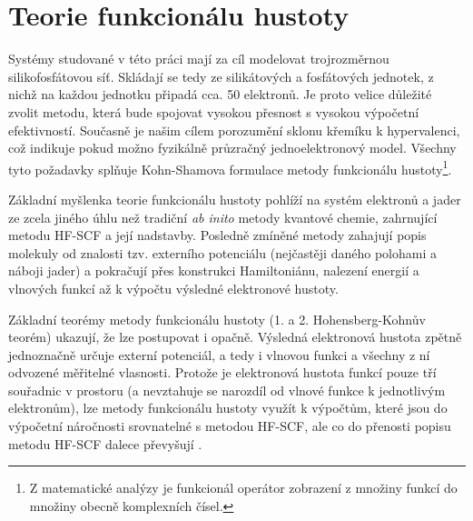 \documentclass[
digital, %
table,   %
lof,     %
lot,     %
oneside,
]{fithesis3}
\begin{document}
\section{Teorie funkcionálu hustoty}
Systémy studované v této práci mají za cíl modelovat trojrozměrnou silikofosfátovou síť. Skládají se tedy ze silikátových a fosfátových jednotek, z nichž na každou jednotku připadá cca. 50 elektronů. Je proto velice důležité zvolit metodu, která bude spojovat vysokou přesnost s vysokou výpočetní efektivností. Současně je našim cílem porozumění sklonu křemíku k hypervalenci, což indikuje pokud možno fyzikálně průzračný jednoelektronový model. Všechny tyto požadavky splňuje Kohn-Shamova formulace metody funkcionálu hustoty\footnote{Z matematické analýzy je funkcionál operátor zobrazení z množiny funkcí do množiny obecně komplexních čísel.}\cite{bickelhaupt2007kohn}.

Základní myšlenka teorie funkcionálu hustoty pohlíží na systém elektronů a jader ze zcela jiného úhlu než tradiční \textit{ab inito} metody kvantové chemie, zahrnující metodu HF-SCF a její nadstavby. Posledně zmíněné metody zahajují popis molekuly od znalosti tzv. externího potenciálu (nejčastěji daného polohami a náboji jader) a pokračují přes konstrukci Hamiltoniánu, nalezení energií a vlnových funkcí až k výpočtu výsledné elektronové hustoty.

Základní teorémy metody funkcionálu hustoty (1. a 2. Hohensberg-Kohnův teorém) ukazují, že lze postupovat i opačně. Výsledná elektronová hustota zpětně jednoznačně určuje externí potenciál, a tedy i vlnovou funkci a všechny z ní odvozené měřitelné vlasnosti. Protože je elektronová hustota funkcí pouze tří souřadnic v prostoru (a nevztahuje se narozdíl od vlnové funkce k jednotlivým elektronům), lze metody funkcionálu hustoty využít k výpočtům, které jsou do výpočetní náročnosti srovnatelné s metodou HF-SCF, ale co do přenosti popisu metodu HF-SCF dalece převyšují \cite{jensen2007introduction}.\\
\end{document}
